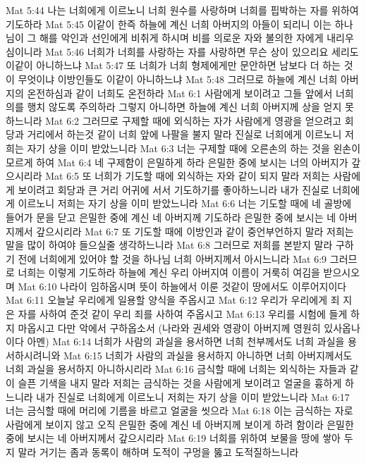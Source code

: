 Mat 5:44  나는 너희에게 이르노니 너희 원수를 사랑하며 너희를 핍박하는 자를 위하여 기도하라
Mat 5:45  이같이 한즉 하늘에 계신 너희 아버지의 아들이 되리니 이는 하나님이 그 해를 악인과 선인에게 비취게 하시며 비를 의로운 자와 불의한 자에게 내리우심이니라
Mat 5:46  너희가 너희를 사랑하는 자를 사랑하면 무슨 상이 있으리요 세리도 이같이 아니하느냐
Mat 5:47  또 너희가 너희 형제에게만 문안하면 남보다 더 하는 것이 무엇이냐 이방인들도 이같이 아니하느냐
Mat 5:48  그러므로 하늘에 계신 너희 아버지의 온전하심과 같이 너희도 온전하라
Mat 6:1  사람에게 보이려고 그들 앞에서 너희 의를 행치 않도록 주의하라 그렇지 아니하면 하늘에 계신 너희 아버지께 상을 얻지 못하느니라
Mat 6:2  그러므로 구제할 때에 외식하는 자가 사람에게 영광을 얻으려고 회당과 거리에서 하는것 같이 너희 앞에 나팔을 불지 말라 진실로 너희에게 이르노니 저희는 자기 상을 이미 받았느니라
Mat 6:3  너는 구제할 때에 오른손의 하는 것을 왼손이 모르게 하여
Mat 6:4  네 구제함이 은밀하게 하라 은밀한 중에 보시는 너의 아버지가 갚으시리라
Mat 6:5  또 너희가 기도할 때에 외식하는 자와 같이 되지 말라 저희는 사람에게 보이려고 회당과 큰 거리 어귀에 서서 기도하기를 좋아하느니라 내가 진실로 너희에게 이르노니 저희는 자기 상을 이미 받았느니라
Mat 6:6  너는 기도할 때에 네 골방에 들어가 문을 닫고 은밀한 중에 계신 네 아버지께 기도하라 은밀한 중에 보시는 네 아버지께서 갚으시리라
Mat 6:7  또 기도할 때에 이방인과 같이 중언부언하지 말라 저희는 말을 많이 하여야 들으실줄 생각하느니라
Mat 6:8  그러므로 저희를 본받지 말라 구하기 전에 너희에게 있어야 할 것을 하나님 너희 아버지께서 아시느니라
Mat 6:9  그러므로 너희는 이렇게 기도하라 하늘에 계신 우리 아버지여 이름이 거룩히 여김을 받으시오며
Mat 6:10  나라이 임하옵시며 뜻이 하늘에서 이룬 것같이 땅에서도 이루어지이다
Mat 6:11  오늘날 우리에게 일용할 양식을 주옵시고
Mat 6:12  우리가 우리에게 죄 지은 자를 사하여 준것 같이 우리 죄를 사하여 주옵시고
Mat 6:13  우리를 시험에 들게 하지 마옵시고 다만 악에서 구하옵소서 (나라와 권세와 영광이 아버지께 영원히 있사옵나이다 아멘)
Mat 6:14  너희가 사람의 과실을 용서하면 너희 천부께서도 너희 과실을 용서하시려니와
Mat 6:15  너희가 사람의 과실을 용서하지 아니하면 너희 아버지께서도 너희 과실을 용서하지 아니하시리라
Mat 6:16  금식할 때에 너희는 외식하는 자들과 같이 슬픈 기색을 내지 말라 저희는 금식하는 것을 사람에게 보이려고 얼굴을 흉하게 하느니라 내가 진실로 너희에게 이르노니 저희는 자기 상을 이미 받았느니라
Mat 6:17  너는 금식할 때에 머리에 기름을 바르고 얼굴을 씻으라
Mat 6:18  이는 금식하는 자로 사람에게 보이지 않고 오직 은밀한 중에 계신 네 아버지께 보이게 하려 함이라 은밀한 중에 보시는 네 아버지께서 갚으시리라
Mat 6:19  너희를 위하여 보물을 땅에 쌓아 두지 말라 거기는 좀과 동록이 해하며 도적이 구멍을 뚫고 도적질하느니라
